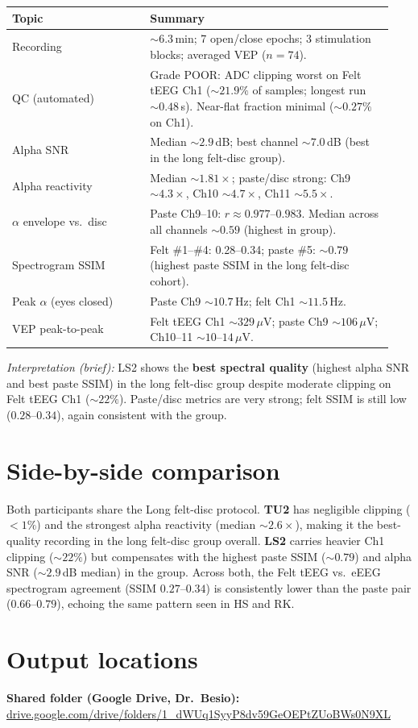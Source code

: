 \documentclass[11pt]{article}
\begin{document}
\begin{table}[h]
  \centering
  \small
  \begin{tabular}{@{}p{0.34\linewidth}p{0.60\linewidth}@{}}
    \toprule
    \textbf{Topic} & \textbf{Summary} \\
    \midrule
    Recording & ${\sim}6.3$\,min; 7 open/close epochs; 3 stimulation blocks; averaged VEP ($n=74$). \\
    QC (automated) & Grade POOR: ADC clipping worst on Felt tEEG Ch1 (${\sim}21.9\%$ of samples; longest run ${\sim}0.48$\,s). Near-flat fraction minimal (${\sim}0.27\%$ on Ch1). \\
    Alpha SNR & Median ${\sim}2.9$\,dB; best channel ${\sim}7.0$\,dB (best in the long felt-disc group). \\
    Alpha reactivity & Median ${\sim}1.81\times$; paste/disc strong: Ch9 ${\sim}4.3\times$, Ch10 ${\sim}4.7\times$, Ch11 ${\sim}5.5\times$. \\
    $\alpha$ envelope vs.\ disc & Paste Ch9--10: $r \approx 0.977$--$0.983$. Median across all channels ${\sim}0.59$ (highest in group). \\
    Spectrogram SSIM & Felt \#1--\#4: 0.28--0.34; paste \#5: ${\sim}0.79$ (highest paste SSIM in the long felt-disc cohort). \\
    Peak $\alpha$ (eyes closed) & Paste Ch9 ${\sim}10.7$\,Hz; felt Ch1 ${\sim}11.5$\,Hz. \\
    VEP peak-to-peak & Felt tEEG Ch1 ${\sim}329$\,$\mu$V; paste Ch9 ${\sim}106$\,$\mu$V; Ch10--11 ${\sim}10$--$14$\,$\mu$V. \\
    \bottomrule
  \end{tabular}
\end{table}

\noindent\textit{Interpretation (brief):} LS2 shows the \textbf{best spectral quality} (highest alpha SNR and best paste SSIM) in the long felt-disc group despite moderate clipping on Felt tEEG Ch1 (${\sim}22\%$). Paste/disc metrics are very strong; felt SSIM is still low ($0.28$--$0.34$), again consistent with the group.

\section*{Side-by-side comparison}
Both participants share the Long felt-disc protocol. \textbf{TU2} has negligible clipping ($<1\%$) and the strongest alpha reactivity (median ${\sim}2.6\times$), making it the best-quality recording in the long felt-disc group overall. \textbf{LS2} carries heavier Ch1 clipping (${\sim}22\%$) but compensates with the highest paste SSIM (${\sim}0.79$) and alpha SNR (${\sim}2.9$\,dB median) in the group. Across both, the Felt tEEG vs.\ eEEG spectrogram agreement (SSIM $0.27$--$0.34$) is consistently lower than the paste pair ($0.66$--$0.79$), echoing the same pattern seen in HS and RK.

\section*{Output locations}
\noindent\textbf{Shared folder (Google Drive, Dr.\ Besio):}\\
\href{https://drive.google.com/drive/folders/1_dWUq1SyyP8dv59GeOEPtZUoBWs0N9XL?usp=drive_link}{drive.google.com/drive/folders/1\_dWUq1SyyP8dv59GeOEPtZUoBWs0N9XL}
\end{document}

